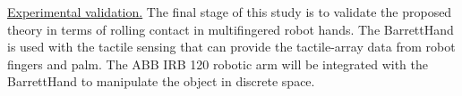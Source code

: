 \noindent\uline{Experimental validation.} The final stage of this study is to validate the proposed theory in terms of rolling contact in multifingered robot hands. The BarrettHand is used with the tactile sensing that can provide the tactile-array data from robot fingers and palm. The ABB IRB 120 robotic arm will be integrated with the BarrettHand to manipulate the object in discrete space.






